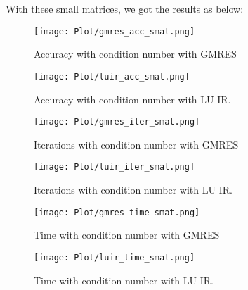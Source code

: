 With these small matrices, we got the results as below:
\begin{figure}[ht]
     \begin{minipage}[b]{0.5\linewidth}
        \centering
   \texttt{[image: Plot/gmres\_acc\_smat.png]}
        \caption{Accuracy with condition number with GMRES}
        \label{fig:image1}
    \end{minipage}
    \hspace{0.5cm} 
    \begin{minipage}[b]{0.5\linewidth}
        \centering
        \texttt{[image: Plot/luir\_acc\_smat.png]}
        \caption{Accuracy with condition number with LU-IR.}
        \label{fig:image2}
    \end{minipage}
\end{figure}

\begin{figure}[ht]
     \begin{minipage}[b]{0.5\linewidth}
        \centering
   \texttt{[image: Plot/gmres\_iter\_smat.png]}
        \caption{Iterations with condition number with GMRES}
        \label{fig:image3}
    \end{minipage}
    \hspace{0.5cm} 
    \begin{minipage}[b]{0.5\linewidth}
        \centering
        \texttt{[image: Plot/luir\_iter\_smat.png]}
        \caption{Iterations with condition number with LU-IR.}
        \label{fig:image4}
    \end{minipage}
\end{figure}
\newpage
\begin{figure}[ht]
     \begin{minipage}[b]{0.5\linewidth}
        \centering
   \texttt{[image: Plot/gmres\_time\_smat.png]}
        \caption{Time with condition number with GMRES}
        \label{fig:image5}
    \end{minipage}
    \hspace{0.5cm} 
    \begin{minipage}[b]{0.5\linewidth}
        \centering
        \texttt{[image: Plot/luir\_time\_smat.png]}
        \caption{Time with condition number with LU-IR.}
        \label{fig:image6}
    \end{minipage}
\end{figure}


